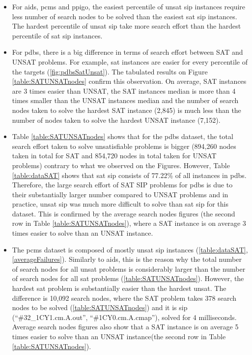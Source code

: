 \documentclass{l4proj}
\newcounter{example}[section]
\begin{document}
\begin{itemize}
\item For aids, pcms and ppigo, the easiest percentile of \gls{unsat} \gls{sip} instances require less number of search nodes to be solved than the easiest \gls{sat} \gls{sip} instances. The hardest percentile of \gls{unsat} \gls{sip} take more search effort than the hardest percentile of \gls{sat} \gls{sip} instances.

\item For pdbs, there is a big difference in terms of search effort between SAT and UNSAT problems. For example, \gls{sat} instances are easier for every percentile of the targets (\ref{fig:pdbsSatUnsat}). The tabulated results on Figure \ref{table:SATUNSATnodes} confirm this observation. On average, SAT instances are 3 times easier than UNSAT, the SAT instances median is more than 4 times smaller than the UNSAT instances median and the number of search nodes taken to solve the hardest SAT instance (2,845) is much less than the number of nodes taken to solve the hardest UNSAT instance (7,152).

\item Table \ref{table:SATUNSATnodes} shows that for the pdbs dataset, the total search effort taken to solve unsatisfiable problems is bigger (894,260 nodes taken in total for SAT and 854,720 nodes in total taken for UNSAT problems) contrary to what we observed on the Figures. However, Table \ref{table:dataSAT} shows that \gls{sat} \gls{sip} consists of 77.22\% of all instances in pdbs. Therefore, the large search effort of SAT SIP problems for pdbs is due to their substantially larger number compared to UNSAT problems and in practice, \gls{unsat} \gls{sip} was much more difficult to solve than \gls{sat} \gls{sip} for this dataset. This is confirmed by the average search nodes figures (the second row in Table \ref{table:SATUNSATnodes}), where a SAT instance is on average 3 times easier to solve than an UNSAT instance.

\item The pcms dataset is composed of mostly \gls{unsat} \gls{sip} instances (\ref{table:dataSAT}, \ref{averageFailures}). Similarly to aids, this is the reason why the total number of search nodes for all \gls{unsat} problems is considerably larger than the number of search nodes for all \gls{sat} problems (\ref{table:SATUNSATnodes}). However, the hardest \gls{sat} problem is substantially easier than the hardest \gls{unsat}. The difference is 10,092 search nodes, where the SAT problem takes 378 search nodes to be solved (\ref{table:SATUNSATnodes}) and it is \gls{sip} (``\#32\_1CY1.cm.A.out'', ``\#1CY0.cm.A.cmap''), solved for 4 milliseconds. Average search nodes figures also show that a SAT instance is on average 5 times easier to solve than an UNSAT instance(the second row in Table \ref{table:SATUNSATnodes}).


\end{itemize}
\end{document}
